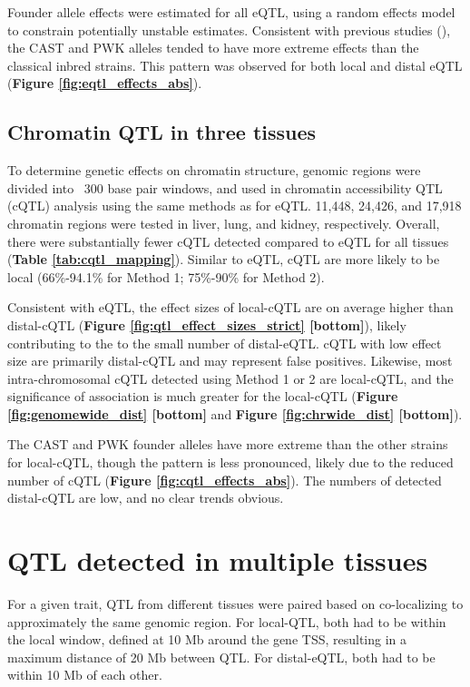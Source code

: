 Founder allele effects were estimated for all eQTL, using a random effects model to constrain potentially unstable estimates. Consistent with previous studies (\eg \cite{Aylor2011}), the CAST and PWK alleles tended to have more extreme effects than the classical inbred strains. This pattern was observed for both local and distal eQTL (\textbf{Figure \ref{fig:eqtl_effects_abs}}).

\subsection{Chromatin QTL in three tissues}

To determine genetic effects on chromatin structure, genomic regions were divided into ~300 base pair windows, and used in chromatin accessibility QTL (cQTL) analysis using the same methods as for eQTL. 11,448, 24,426, and 17,918 chromatin regions were tested in liver, lung, and kidney, respectively. Overall, there were substantially fewer cQTL detected compared to eQTL for all tissues (\textbf{Table \ref{tab:cqtl_mapping}}). Similar to eQTL, cQTL are more likely to be local (66\%-94.1\% for Method 1; 75\%-90\% for Method 2).

Consistent with eQTL, the effect sizes of local-cQTL are on average higher than distal-cQTL (\textbf{Figure \ref{fig:qtl_effect_sizes_strict} [bottom]}), likely contributing to the to the small number of distal-eQTL. cQTL with low effect size are primarily distal-cQTL and may represent false positives. Likewise, most intra-chromosomal cQTL detected using Method 1 or 2 are local-cQTL, and the significance of association is much greater for the local-cQTL  (\textbf{Figure \ref{fig:genomewide_dist} [bottom]} and \textbf{Figure \ref{fig:chrwide_dist} [bottom]}).

The CAST and PWK founder alleles have more extreme than the other strains for local-cQTL, though the pattern is less pronounced, likely due to the reduced number of cQTL (\textbf{Figure \ref{fig:cqtl_effects_abs}}). The numbers of detected distal-cQTL are low, and no clear trends obvious.

\section{QTL detected in multiple tissues}

For a given trait, QTL from different tissues were paired based on co-localizing to approximately the same genomic region. For local-QTL, both had to be within the local window, defined at 10 Mb around the gene TSS, resulting in a maximum distance of 20 Mb between QTL. For distal-eQTL, both had to be within 10 Mb of each other. 

